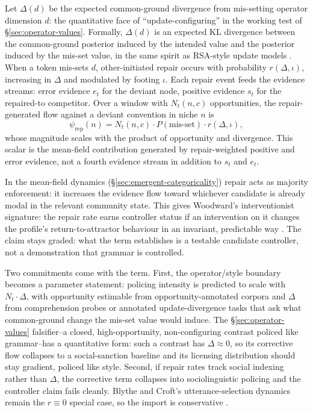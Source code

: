 \documentclass[12pt,letterpaper]{article}
\begin{document}
Let $\Delta(d)$ be the expected common-ground divergence from mis-setting
operator dimension $d$: the quantitative face of \enquote{update-configuring}
in the working test of \S\ref{sec:operator-values}. Formally, $\Delta(d)$ is an
expected KL divergence between the common-ground posterior induced by the
intended value and the posterior induced by the mis-set value, in the same
spirit as RSA-style update models \parencite{GoodmanFrank2016}. When a token
mis-sets $d$, other-initiated repair occurs with probability $r(\Delta,\iota)$,
increasing in $\Delta$ and modulated by footing $\iota$. Each repair event feeds
the evidence streams: error evidence $e_t$ for the deviant node, positive
evidence $s_t$ for the repaired-to competitor. Over a window with $N_t(n,c)$
opportunities, the repair-generated flow against a deviant convention in niche
$n$ is
\begin{equation}
\psi_{\mathrm{rep}}(n)=N_t(n,c)\cdot
P(\text{mis-set})\cdot r(\Delta,\iota),
\label{eq:repair-flow}
\end{equation}
whose magnitude scales with the product of opportunity and divergence. This
scalar is the mean-field contribution generated by repair-weighted positive and
error evidence, not a fourth evidence stream in addition to $s_t$ and $e_t$.

In the mean-field dynamics (\S\ref{sec:emergent-categoricality}) repair acts as
majority enforcement: it increases the evidence flow toward whichever candidate is
already modal in the relevant community state. This gives Woodward's
interventionist signature: the repair rate earns controller status if an
intervention on it changes the profile's return-to-attractor behaviour in an
invariant, predictable way \parencite{woodward2001,
woodward2003MakingThingsHappen}. The claim stays graded: what the term
establishes is a testable candidate controller, not a demonstration that
grammar is controlled.

Two commitments come with the term. First, the operator/style boundary becomes
a parameter statement: policing intensity is predicted to scale with
$N_t\cdot\Delta$, with opportunity estimable from opportunity-annotated
corpora and $\Delta$ from comprehension probes or annotated update-divergence
tasks that ask what common-ground change the mis-set value would induce. The
\S\ref{sec:operator-values}
falsifier--a closed, high-opportunity, non-configuring contrast policed like
grammar--has a quantitative form: such a contrast has $\Delta\approx0$, so
its corrective flow collapses to a social-sanction baseline and its licensing
distribution should stay gradient, policed like style. Second, if repair rates
track social indexing rather than $\Delta$, the corrective term collapses into
sociolinguistic policing and the controller claim fails cleanly. Blythe and
Croft's utterance-selection dynamics remain the $r\equiv0$ special case, so the
import is conservative \autocite{BlytheCroft2012}.
\end{document}
